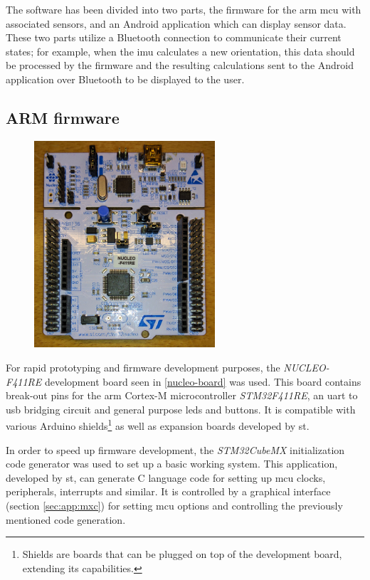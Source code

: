 The software has been divided into two parts, the firmware for the \gls{arm} \gls{mcu} with associated sensors, and an Android application which can display sensor data. These two parts utilize a Bluetooth connection to communicate their current states; for example, when the \gls{imu} calculates a new orientation, this data should be processed by the firmware and the resulting calculations sent to the Android application over Bluetooth to be displayed to the user.

\subsection{ARM firmware}
\begin{figure}[H]
\centering
\includegraphics[width=0.6\textwidth]{Figures/stm32nucleo.jpg}
\label{nucleo-board}
\end{figure}

For rapid prototyping and firmware development purposes, the \emph{NUCLEO-F411RE} development board seen in \autoref{nucleo-board} was used. This board contains break-out pins for the \gls{arm} Cortex-M microcontroller \emph{STM32F411RE}, an \gls{uart} to \gls{usb} bridging circuit and general purpose \gls{led}s and buttons. It is compatible with various Arduino shields\footnote{Shields are boards that can be plugged on top of the development board, extending its capabilities.} as well as expansion boards developed by \gls{st}.

In order to speed up firmware development, the \emph{STM32CubeMX}\cite{stm32cubemx} initialization code generator was used to set up a basic working system. This application, developed by \gls{st}, can generate C language code for setting up \gls{mcu} clocks, peripherals, interrupts and similar. It is controlled by a graphical interface (section \ref{sec:app:mxc}) for setting \gls{mcu} options and controlling the previously mentioned code generation.

